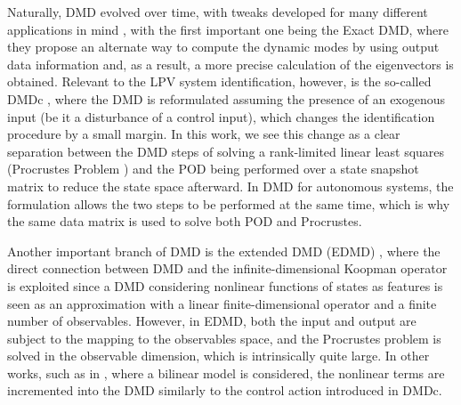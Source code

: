 Naturally, DMD evolved over time, with tweaks developed for many different applications in mind \cite{Schmid2022}, with the first important one being the Exact DMD, where they propose an alternate way to compute the dynamic modes by using output data information and, as a result, a more precise calculation of the eigenvectors is obtained.
%
Relevant to the LPV system identification, however, is the so-called DMDc \cite{DMDc,Schmid2022}, where the DMD is reformulated assuming the presence of an exogenous input (be it a disturbance of a control input), which changes the identification procedure by a small margin.
%
In this work, we see this change as a clear separation between the DMD steps of solving a rank-limited linear least squares (Procrustes Problem \cite{Baddoo2022}) and the POD being performed over a state snapshot matrix to reduce the state space afterward.
%
In DMD for autonomous systems, the formulation allows the two steps to be performed at the same time, which is why the same data matrix is used to solve both POD and Procrustes.


Another important branch of DMD is the extended DMD (EDMD) \cite{Williams2015,Schmid2022}, where the direct connection between DMD and the infinite-dimensional Koopman operator is exploited since a DMD considering nonlinear functions of states as features is seen as an approximation with a linear finite-dimensional operator and a finite number of observables.
%
However, in EDMD, both the input and output are subject to the mapping to the observables space, and the Procrustes problem is solved in the observable dimension, which is intrinsically quite large.
%
In other works, such as in \cite{Gosea2021}, where a bilinear model is considered, the nonlinear terms are incremented into the DMD similarly to the control action introduced in DMDc.


